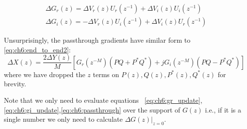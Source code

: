 \begin{gather}
  \Delta G_r(z) = \Delta V_r(z) U_r(z^{-1}) + \Delta V_i(z) U_i(z^{-1})  \label{eq:ch6:gr_update}\\
  \Delta G_i(z) =  -\Delta V_r(z) U_i(z^{-1}) + \Delta V_i(z) U_r(z^{-1})  \label{eq:ch6:gi_update} 
\end{gather}

Unsurprisingly, the passthrough gradients have similar form to
\autoref{eq:ch6:end_to_end2}:
\begin{equation}\label{eq:ch6:passthrough}
    \Delta X(z) = \frac{2\Delta Y(z)}{M} \left[G_r(z^{-M})\left( PQ + P^*Q^* \right)\right. + 
      \left. jG_i(z^{-M}) \left(PQ-P^*Q^* \right) \right] 
\end{equation}
where we have dropped the $z$ terms on $P(z), Q(z), P^*(z), Q^*(z)$ for brevity.

Note that we only need to evaluate equations
~\ref{eq:ch6:gr_update},\ref{eq:ch6:gi_update},\ref{eq:ch6:passthrough} over the
support of $G(z)$ i.e., if it is a single number we only need to calculate
$\left.\Delta G(z)\right\rvert_{z=0}$.


